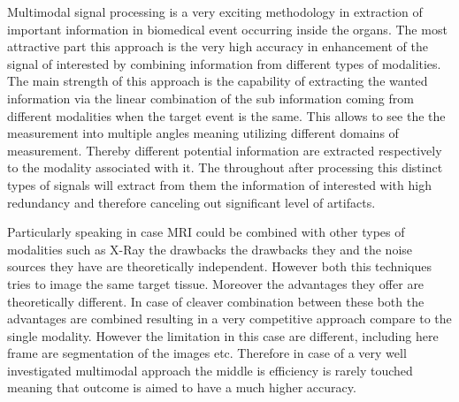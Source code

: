 
Multimodal signal processing is a very exciting methodology in extraction of important information in biomedical event occurring inside the organs. The most attractive part this approach is the very high accuracy in enhancement of the signal of interested by combining information from different types of modalities. The main strength of this approach is the capability of extracting the wanted information via the linear combination of the sub information coming from different modalities when the target event is the same. This allows to see the the measurement into multiple angles meaning utilizing different domains of measurement. Thereby different potential information are extracted respectively to the modality associated with it. The throughout after processing this distinct types of signals will extract from them the information of interested with high redundancy and therefore canceling out significant level of artifacts. 

Particularly speaking in case MRI could be combined with other types of modalities such as X-Ray the drawbacks the drawbacks they and the noise sources they have are theoretically independent. However both this techniques tries to image the same target tissue. Moreover the advantages they offer are theoretically different. In case of cleaver combination between these both the advantages are combined resulting in a very competitive approach compare to the single modality. However the limitation in this case are different, including here frame are segmentation of the images etc. Therefore in case of a very well investigated multimodal approach the middle is efficiency is rarely touched meaning that outcome is aimed to have a much higher accuracy.

